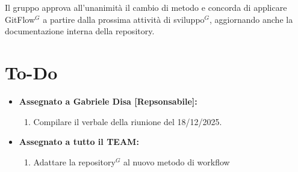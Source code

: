 \documentclass[a4paper,10pt]{article}
\begin{document}
Il gruppo approva all’unanimità il cambio di metodo e concorda di applicare GitFlow$^G$ a partire dalla prossima attività di sviluppo$^G$, aggiornando anche la documentazione interna della repository.

\vspace{1cm}

\section*{To-Do}
\begin{itemize}
\item \textbf{Assegnato a Gabriele Disa [Repsonsabile]:}
    \begin{enumerate}
    \item Compilare il verbale della riunione del 18/12/2025.
    \end{enumerate}
\item \textbf{Assegnato a tutto il TEAM:}
    \begin{enumerate}
    \item Adattare la repository$^G$ al nuovo metodo di workflow
    \end{enumerate}
\end{itemize}
\end{document}
